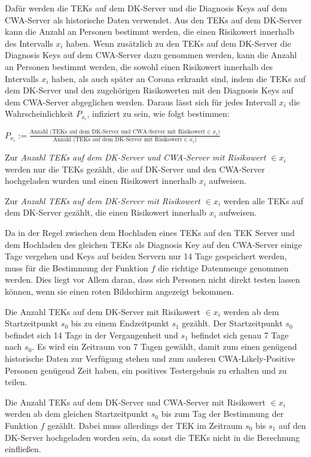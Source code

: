 \documentclass[conference,compsoc]{IEEEtran}
\begin{document}
Dafür werden die TEKs auf dem DK-Server und die Diagnosis Keys auf dem CWA-Server als historische Daten verwendet.
Aus den TEKs auf dem DK-Server kann die Anzahl an Personen bestimmt werden, die einen Risikowert innerhalb des Intervalls $x_i$ haben.
Wenn zusätzlich zu den TEKs auf dem DK-Server die Diagnosis Keys auf dem CWA-Server dazu genommen werden, 
kann die Anzahl an Personen bestimmt werden, die sowohl einen Risikowert innerhalb des Intervalls $x_i$ haben, als auch später an Corona erkrankt sind, 
indem die TEKs auf dem DK-Server und den zugehörigen Risikowerten mit den Diagnosis Keys auf dem CWA-Server abgeglichen werden. 
Daraus lässt sich für jedes Intervall $x_i$ die Wahrscheinlichkeit $P_{x_i}$, infiziert zu sein, wie folgt bestimmen:

\centerline{\text{ }}
\centerline{$P_{x_i} := \frac{\text{Anzahl (TEKs auf dem DK-Server und CWA-Server mit Risikowert} \in x_i)}{\text{Anzahl (TEKs auf dem DK-Server mit Risikowert} \in x_i)}$}
\centerline{\text{ }}

Zur \textit{Anzahl TEKs auf dem DK-Server und CWA-Server mit Risikowert $\in x_i$} werden nur die TEKs gezählt, 
die auf DK-Server und den CWA-Server hochgeladen wurden und einen Risikowert innerhalb $x_i$ aufweisen. 

Zur \textit{Anzahl TEKs auf dem DK-Server mit Risikowert $\in x_i$} werden alle TEKs auf dem DK-Server gezählt, die einen Risikowert innerhalb $x_i$ aufweisen.

Da in der Regel zwischen dem Hochladen eines TEKs auf den TEK Server und dem Hochladen des gleichen TEKs als Diagnosis Key auf den CWA-Server einige Tage vergehen und 
Keys auf beiden Servern nur 14 Tage gespeichert werden, muss für die Bestimmung der Funktion $f$ die richtige Datenmenge genommen werden.
Dies liegt vor Allem daran, dass sich Personen nicht direkt testen lassen können, wenn sie einen roten Bildschirm angezeigt bekommen.

Die Anzahl TEKs auf dem DK-Server mit Risikowert $\in x_i$ werden ab dem Startzeitpunkt $s_0$ bis zu einem Endzeitpunkt $s_1$ gezählt.
Der Startzeitpunkt $s_0$ befindet sich 14 Tage in der Vergangenheit und $s_1$ befindet sich genau 7 Tage nach $s_0$.
Es wird ein Zeitraum von 7 Tagen gewählt, damit zum einen genügend historische Daten zur Verfügung stehen
und zum anderen CWA-Likely-Positive Personen genügend Zeit haben, ein positives Testergebnis zu erhalten und zu teilen.

Die Anzahl TEKs auf dem DK-Server und CWA-Server mit Risikowert $\in x_i$ werden ab dem gleichen Startzeitpunkt $s_0$ bis zum Tag der Bestimmung der Funktion $f$ gezählt.
Dabei muss allerdings der TEK im Zeitraum $s_0$ bis $s_1$ auf den DK-Server hochgeladen worden sein, da sonst die TEKs nicht in die Berechnung einfließen. 
\end{document}
